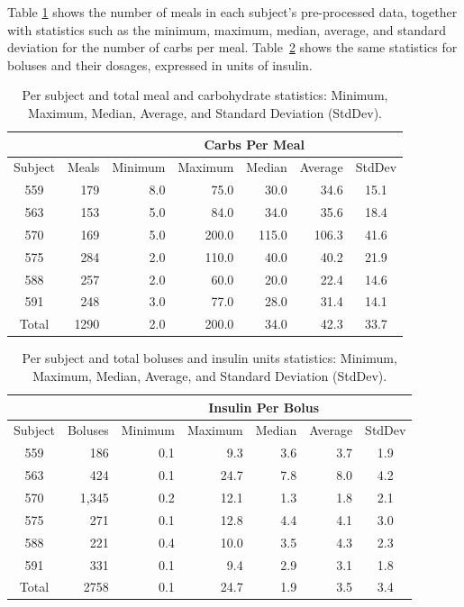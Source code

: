\documentclass[graybox]{svmult}
\begin{document}
Table \ref{tab:meals} shows the number of meals in each subject's pre-processed data, together with statistics such as the minimum, maximum, median, average, and standard deviation for the number of carbs per meal. Table~\ref{tab:boluses} shows the same statistics for boluses and their dosages, expressed in units of insulin.
\begin{table}[h]\setlength{\tabcolsep}{4pt}
\begin{center}
\caption{Per subject and total meal and carbohydrate statistics: Minimum, Maximum, Median, Average, and Standard Deviation (StdDev).}
\label{tab:meals}
\begin{tabular}{|cr|rrrrc|}
    \cline{3-7}
    \multicolumn{2}{c}{} & \multicolumn{5}{|c|}{Carbs Per Meal}\\
	\hline
	Subject & \multicolumn{1}{c|}{Meals} & \multicolumn{1}{c}{Minimum} & \multicolumn{1}{c}{Maximum}
	& \multicolumn{1}{c}{Median} & \multicolumn{1}{c}{Average} & StdDev\\
	\hline
	559 & 179 & 8.0 & 75.0 & 30.0 & 34.6 & 15.1\\
    563 & 153 & 5.0 & 84.0 & 34.0 & 35.6 & 18.4\\
    570 & 169 & 5.0 & 200.0 & 115.0 & 106.3 & 41.6\\
	575 & 284 & 2.0 & 110.0 & 40.0 & 40.2 & 21.9\\
	588 & 257 & 2.0 & 60.0 & 20.0 & 22.4 & 14.6\\
	591 & 248 & 3.0 & 77.0 & 28.0 & 31.4 & 14.1\\
	\hline
	Total & 1290 & 2.0 & 200.0 & 34.0 & 42.3 & 33.7\\
	\hline
\end{tabular}
\end{center}
\end{table}
\begin{table}[h]\setlength{\tabcolsep}{4pt}
\begin{center}
\caption{Per subject and total boluses and insulin units statistics: Minimum, Maximum, Median, Average, and Standard Deviation (StdDev).}
\label{tab:boluses}
\begin{tabular}{|cr|rrrrc|}
    \cline{3-7}
    \multicolumn{2}{c}{} & \multicolumn{5}{|c|}{Insulin Per Bolus}\\
	\hline
	Subject & \multicolumn{1}{c|}{Boluses}
	& \multicolumn{1}{c}{Minimum} & \multicolumn{1}{c}{Maximum} & \multicolumn{1}{c}{Median} & \multicolumn{1}{c}{Average} & StdDev\\
	\hline
	559 & 186 & 0.1 & 9.3 & 3.6 & 3.7 & 1.9\\
    563 & 424 & 0.1 & 24.7 & 7.8 & 8.0 & 4.2\\
    570 & 1,345 & 0.2 & 12.1 & 1.3 & 1.8 & 2.1\\
	575 & 271 & 0.1 & 12.8 & 4.4 & 4.1 & 3.0\\
	588 & 221 & 0.4 & 10.0 & 3.5 & 4.3 & 2.3\\
	591 & 331 & 0.1 & 9.4 & 2.9 & 3.1 & 1.8\\
	\hline
	Total & 2758 & 0.1 & 24.7 & 1.9 & 3.5 & 3.4\\
	\hline
\end{tabular}
\end{center}
\end{table}
\end{document}
